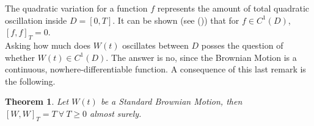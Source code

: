 \documentclass[11pt]{report}
\newtheorem{theorem}{Theorem}
\newcommand{\aycite}[1]{%
 \citeauthor{#1} (\citeyear{#1})}
\begin{document}
The quadratic variation for a function $f$ represents the amount of total quadratic oscillation inside $D = [0,T]$. It can be shown (see \aycite{shreve}) that for $f \in C^1(D)$, $[f,f]_T = 0$.\\

Asking how much does $W(t)$ oscillates between $D$ posses the question of whether $W(t) \in C^1(D)$. The answer is no, since the Brownian Motion is a continuous, nowhere-differentiable function. A consequence of this last remark is the following.

\begin{theorem}\label{th:quadratic_brownian_motion}
	Let $W(t)$ be a Standard Brownian Motion, then $[W, W]_T = T \ \forall \ T \geq 0$ almost surely.
\end{theorem}
\end{document}
